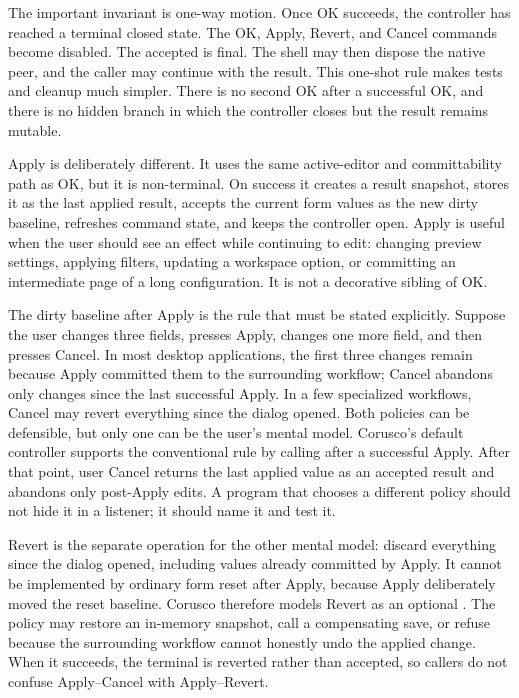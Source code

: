 The important invariant is one-way motion. Once OK succeeds, the controller has
reached a terminal closed state. The OK, Apply, Revert, and Cancel commands
become disabled. The accepted  is final. The shell may then
dispose the native peer, and the caller may continue with the result. This
one-shot rule makes tests and cleanup much simpler. There is no second OK after
a successful OK, and there is no hidden branch in which the controller closes
but the result remains mutable.

Apply is deliberately different. It uses the same active-editor and
committability path as OK, but it is non-terminal. On success it creates a
result snapshot, stores it as the last applied result, accepts the current form
values as the new dirty baseline, refreshes command state, and keeps the
controller open. Apply is useful when the user should see an effect while
continuing to edit: changing preview settings, applying filters, updating a
workspace option, or committing an intermediate page of a long configuration.
It is not a decorative sibling of OK.

The dirty baseline after Apply is the rule that must be stated explicitly.
Suppose the user changes three fields, presses Apply, changes one more field,
and then presses Cancel. In most desktop applications, the first three changes
remain because Apply committed them to the surrounding workflow; Cancel
abandons only changes since the last successful Apply. In a few specialized
workflows, Cancel may revert everything since the dialog opened. Both policies
can be defensible, but only one can be the user's mental model. Corusco's
default controller supports the conventional rule by calling
 after a successful Apply. After that point, user
Cancel returns the last applied value as an accepted result and abandons only
post-Apply edits. A program that chooses a different policy should not hide it
in a listener; it should name it and test it.

Revert is the separate operation for the other mental model: discard everything
since the dialog opened, including values already committed by Apply. It cannot
be implemented by ordinary form reset after Apply, because Apply deliberately
moved the reset baseline. Corusco therefore models Revert as an optional
. The policy may restore an in-memory snapshot, call a
compensating save, or refuse because the surrounding workflow cannot honestly
undo the applied change. When it succeeds, the terminal  is
reverted rather than accepted, so callers do not confuse Apply--Cancel with
Apply--Revert.

